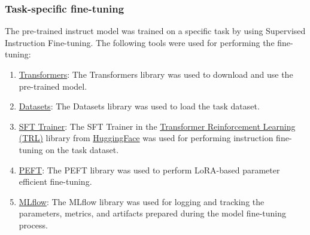 \subsubsection{Task-specific fine-tuning} \label {TaskSpecificFineTuning}
The pre-trained instruct model was trained on a specific task by using Supervised Instruction Fine-tuning. The following tools were used for performing the fine-tuning: 
\begin{enumerate}
\item \href{https://huggingface.co/docs/transformers/en/index}{Transformers}: The Transformers library was used to download and use the pre-trained model.
\item \href{https://huggingface.co/docs/datasets/en/index}{Datasets}: The Datasets library was used to load the task dataset.
\item  \href{https://huggingface.co/docs/trl/en/sft_trainer}{SFT Trainer}: The SFT Trainer in the \href{https://huggingface.co/docs/trl/en/index}{Transformer Reinforcement Learning (TRL)} library from \href{https://huggingface.co/}{HuggingFace} was used for performing instruction fine-tuning on the task dataset.
\item \href{https://huggingface.co/docs/peft/en/index}{PEFT}: The PEFT library was used to perform LoRA-based parameter efficient fine-tuning. 
\item \href{https://mlflow.org/docs/latest/introduction/index.html}{MLflow}: The MLflow library was used for logging and tracking the parameters, metrics, and artifacts prepared during the model fine-tuning process.
\end{enumerate}

